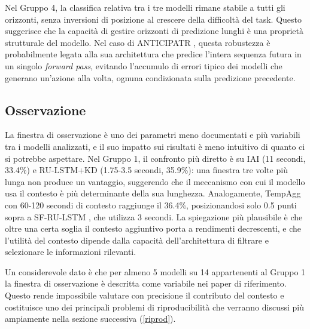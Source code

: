 Nel Gruppo 4, la classifica relativa tra i tre modelli rimane stabile a tutti gli orizzonti, senza inversioni di posizione al crescere della difficoltà del task. Questo suggerisce che la capacità di gestire orizzonti di predizione lunghi è una proprietà strutturale del modello. Nel caso di ANTICIPATR \cite{nawhal2022rethinking}, questa robustezza è probabilmente legata alla sua architettura che predice l'intera sequenza futura in un singolo \textit{forward pass}, evitando l'accumulo di errori tipico dei modelli che generano un'azione alla volta, ognuna condizionata sulla predizione precedente.
\subsection{Osservazione}
La finestra di osservazione è uno dei parametri meno documentati e più variabili tra i modelli analizzati, e il suo impatto sui risultati è meno intuitivo di quanto ci si potrebbe aspettare. Nel Gruppo 1, il confronto più diretto è su IAI \cite{zhang2020egocentric} (11 secondi, 33.4\%) e RU-LSTM+KD \cite{camporese2021knowledge} (1.75-3.5 secondi, 35.9\%): una finestra tre volte più lunga non produce un vantaggio, suggerendo che il meccanismo con cui il modello usa il contesto è più determinante della sua lunghezza. Analogamente, TempAgg \cite{sener2021technical, sener2020temporal} con 60-120 secondi di contesto raggiunge il 36.4\%, posizionandosi solo 0.5 punti sopra a SF-RU-LSTM \cite{osman2021slowfast}, che utilizza 3 secondi. La spiegazione più plausibile è che oltre una certa soglia il contesto aggiuntivo porta a rendimenti decrescenti, e che l'utilità del contesto dipende dalla capacità dell'architettura di filtrare e selezionare le informazioni rilevanti.

Un considerevole dato è che per almeno 5 modelli su 14 appartenenti al Gruppo 1 la finestra di osservazione è descritta come variabile nei paper di riferimento. Questo rende impossibile valutare con precisione il contributo del contesto e costituisce uno dei principali problemi di riproducibilità che verranno discussi più ampiamente nella sezione successiva (\ref{riprod}).

